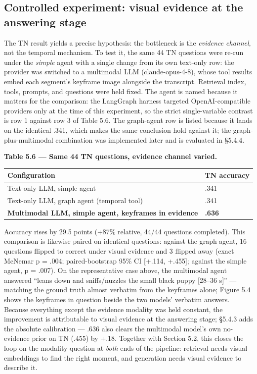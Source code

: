 \subsection{Controlled experiment: visual evidence at the answering
stage}

The TN result yields a precise hypothesis: the bottleneck is the
\emph{evidence channel}, not the temporal mechanism. To test it, the
same 44 TN questions were re-run under the \emph{simple} agent with a
single change from its own text-only row: the provider was switched to a
multimodal LLM (claude-opus-4-8), whose tool results embed each
segment's keyframe image alongside the transcript. Retrieval index,
tools, prompts, and questions were held fixed. The agent is named
because it matters for the comparison: the LangGraph harness targeted
OpenAI-compatible providers only at the time of this experiment, so the
strict single-variable contrast is row 1 against row 3 of Table 5.6. The
graph-agent row is listed because it lands on the identical .341, which
makes the same conclusion hold against it; the graph-plus-multimodal
combination was implemented later and is evaluated in §5.4.4.

\textbf{Table 5.6 --- Same 44 TN questions, evidence channel varied.}

\begin{longtable}[]{@{}ll@{}}
\toprule\noalign{}
Configuration & TN accuracy \\
\midrule\noalign{}
\endhead
\bottomrule\noalign{}
\endlastfoot
Text-only LLM, simple agent & .341 \\
Text-only LLM, graph agent (temporal tool) & .341 \\
\textbf{Multimodal LLM, simple agent, keyframes in evidence} &
\textbf{.636} \\
\end{longtable}

Accuracy rises by 29.5 points (+87\% relative, 44/44 questions
completed). This comparison is likewise paired on identical questions:
against the graph agent, 16 questions flipped to correct under visual
evidence and 3 flipped away (exact McNemar p = .004; paired-bootstrap
95\% CI {[}+.114, +.455{]}; against the simple agent, p = .007). On the
representative case above, the multimodal agent answered ``leans down
and sniffs/nuzzles the small black puppy {[}28--36 s{]}'' --- matching
the ground truth almost verbatim from the keyframes alone; Figure 5.4
shows the keyframes in question beside the two models' verbatim answers.
Because everything except the evidence modality was held constant, the
improvement is attributable to visual evidence at the answering stage;
§5.4.3 adds the absolute calibration --- .636 also clears the multimodal
model's own no-evidence prior on TN (.455) by +.18. Together with
Section 5.2, this closes the loop on the modality question at
\emph{both} ends of the pipeline: retrieval needs visual embeddings to
find the right moment, and generation needs visual evidence to describe
it.

